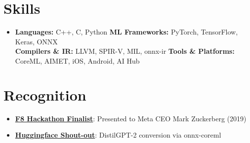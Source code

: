 \documentclass[letterpaper,11pt]{article}
\newcommand{\resumeItem}[2]{
  \item\small{
    \textbf{#1}{: #2 \vspace{-2pt}}
  }
}
\newcommand{\resumeSubItem}[2]{\resumeItem{#1}{#2}\vspace{2pt}}
\newcommand{\resumeSubHeadingListStart}{\begin{itemize}[leftmargin=*]}
\newcommand{\resumeSubHeadingListEnd}{\end{itemize}}
\begin{document}
\section{Skills}
  \resumeSubHeadingListStart
    \item\small{
      \textbf{Languages:} C++, C, Python \hfill
      \textbf{ML Frameworks:} PyTorch, TensorFlow, Keras, ONNX \\
      \textbf{Compilers \& IR:} LLVM, SPIR-V, MIL, onnx-ir \hfill
      \textbf{Tools \& Platforms:} CoreML, AIMET, iOS, Android, AI Hub
    }
  \resumeSubHeadingListEnd

\section{Recognition}
\resumeSubHeadingListStart
    \resumeSubItem{\href{https://devpost.com/software/opencurriculum-by-wattba}{F8 Hackathon Finalist}}{Presented to Meta CEO Mark Zuckerberg (2019)}
    \resumeSubItem{\href{https://x.com/julien_c/status/1181629761761755137}{Huggingface Shout-out}}{DistilGPT-2 conversion via onnx-coreml}
\resumeSubHeadingListEnd
\end{document}

